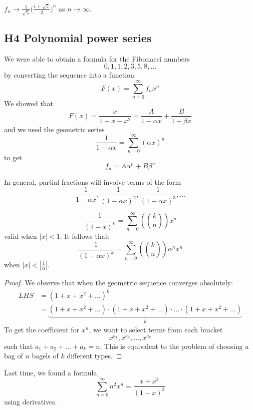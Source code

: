 \documentclass[12pt]{article}
\begin{document}
\begin{corollary}
    $\displaystyle
				f_n \to \frac{1}{\sqrt{5}} \bigg( \frac{1 + \sqrt{5}}{2}\bigg)^n$ as $n\to \infty$.
\end{corollary}

\subsection{H4 Polynomial power series}

We were able to obtain a formula for the Fibonacci numbers \[0,1,1,2,3,5,8,\dots\]
by converting the sequence into a function \[F(x)=\sum_{n=0}^{\infty}f_nx^n\]
We showed that \[F(x)=\frac{x}{1-x-x^2} = \frac{A}{1-\alpha x}+\frac{B}{1-\beta x}\]
and we used the geometric series \[\frac{1}{1-\alpha x}=\sum_{n=0}^{\infty}(\alpha x)^n\]
to get \[f_n=A\alpha^n +B\beta^n\]
\spl

In general, partial fractions will involve terms of the form \[\frac{1}{1-\alpha x},\frac{1}{(1-\alpha x)^2},\frac{1}{(1-\alpha x)^3},\dots\]

\begin{theorem}
    \[\frac{1}{(1-x)^k}=\sum_{n=0}^{\infty}\left({k\choose n}\right)x^n\]
    valid when $|x|<1$. 
    It follows that:
    \[\frac{1}{(1-\alpha x)^k}=\sum_{n=0}^{\infty}\left({k\choose n}\right)\alpha^nx^n\] when \(|x|<\left|\frac{1}{\alpha}\right|\).
\end{theorem}

\begin{proof}
    We observe that when the geometric sequence converges absolutely: \begin{align*}
        LHS &= (1+x+x^2+\dots)^k\\
        &= \underset{k}{\underbrace{(1+x+x^2+\dots)\cdot (1+x+x^2+\dots)\cdot \dots \cdot (1+x+x^2+\dots)}}
    \end{align*}
    To get the coefficient for $x^n$, we want to select terms from each bracket \[x^{a_1},x^{a_2},\dots,x^{a_k}\]
    such that $a_1+a_2+\dots+a_k=n$. This is equivalent to the problem of choosing a bag of $n$ bagels of $k$ different types.
\end{proof}

\spl

Last time, we found a formula \[\sum_{n=0}^{\infty}n^2x^n = \frac{x+x^2}{(1-x)^3}\] using derivatives.
\end{document}
